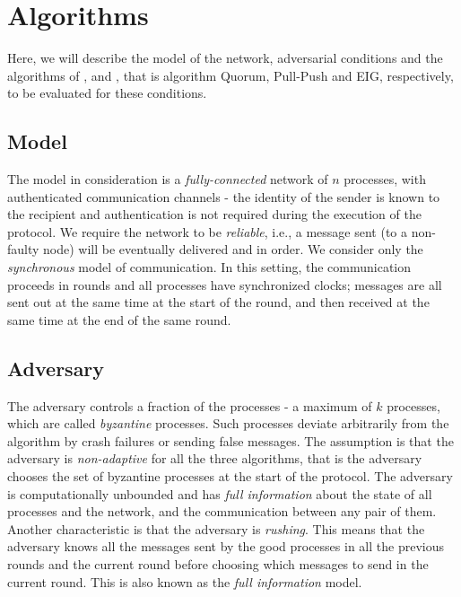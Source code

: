 ﻿\section{Algorithms}
\label{sec:algos}



Here, we will describe the model of the network, adversarial conditions and the algorithms of \cite{BPV06}, \cite{BGH13} and \cite{GarayM98}, that is algorithm Quorum, Pull-Push and EIG, respectively, to be evaluated for these conditions.


\subsection{Model}
The model in consideration is a \textit{fully-connected} network of $n$ processes, with authenticated communication channels - the identity of the sender is known to the recipient and authentication is not required during the execution of the protocol. We require the network to be \textit{reliable}, i.e., a message sent (to a non-faulty node) will be eventually delivered and in order. We consider only the \textit{synchronous} model of communication. In this setting, the communication proceeds in rounds and all processes have synchronized clocks; messages are all sent out at the same time at the start of the round, and then received at the same time at the end of the same round. 

\subsection{Adversary}
The adversary controls a fraction of the processes - a maximum of $k$ processes, which are called \textit{byzantine} processes. Such processes deviate arbitrarily from the algorithm by crash failures or sending false messages. The assumption is that the adversary is \textit{non-adaptive} for all the three algorithms, that is the adversary chooses the set of byzantine processes at the start of the protocol. The adversary is computationally unbounded and has \textit{full information} about the state of all processes and the network, and the communication between any pair of them. Another characteristic is that the adversary is \textit{rushing}. This means that the adversary knows all the messages sent by the good processes in all the previous rounds and the current round before choosing which messages to send in the current round. This is also known as the \textit{full information} model.

